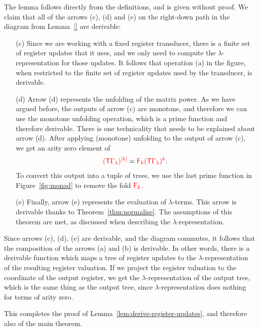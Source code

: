 The lemma follows  directly from the definitions, and is given without proof.  
We claim that all of the arrows (c), (d) and (e) on the  right-down path  in the diagram from Lemma~\ref{}  are derivable:
\begin{itemize}
    \item[(c)] Since we are working with a fixed register transducer, there is a finite set of register updates that it uses, and we only need to compute the $\lambda$-representation for those updates. It follows that operation (a) in the figure, when restricted to the finite set of register updates used by the transducer, is derivable.
    \item[(d)] Arrow (d) represents the unfolding of the matrix power. As we have argued before, the outputs of arrow (c) are monotone, and therefore we can use the monotone unfolding operation, which is a  prime function and therefore derivable. There is one technicality that needs to be explained about arrow (d). After applying (monotone) unfolding to the output of arrow (c), we get an  arity zero element of 
    \begin{align*}
        \ranked{
            \mati k {(\tmonad \rGamma_\lambda)}} = \reduce  k {\powersmall{(\tmonad \rGamma_\lambda)}{k}}.
    \end{align*}
    To convert this output into a tuple of trees, we use the last prime function in Figure~\ref{fig:monad} to remove the fold $\reduce k$.
    \item[(e)] Finally, arrow (e) represents the evaluation of $\lambda$-terms. This arrow is derivable thanks to Theorem~\ref{thm:normalise}. The assumptions of this theorem are met, as discussed when describing the $\lambda$-representation.
\end{itemize}
Since arrows (c), (d), (e) are derivable, and the diagram commutes, it follows that  the composition of the arrows (a) and (b) is derivable. In other words, there is a derivable function which maps a tree of register updates to the $\lambda$-representation of the resulting register valuation. If we project the register valuation to the coordinate of the output register, we get the $\lambda$-representation of the output tree, which is the same thing as the output tree, since $\lambda$-representation does nothing for terms of arity zero. 

This completes the proof of Lemma~\ref{lem:derive-register-updates}, and therefore also of the main theorem. 




